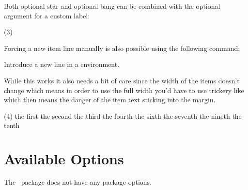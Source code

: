 \documentclass{tasks-manual}
\begin{document}
Both optional star and optional bang can be combined with the optional
argument for a custom label:
\begin{example}
  \begin{tasks}(3)
    \task \sample
    \task* \sample
    \task*[(x)] \sample
    \task \sample
    \task \sample
  \end{tasks}
\end{example}

Forcing a new item line manually is also possible using the
following command:
\begin{commands}
    Introduce a new line in a  environment.
\end{commands}
While this works it also needs a bit of care since the width of the items
doesn't change which means in order to use the full width you'd have to use
trickery like  which then means the danger of the item text sticking
into the margin.

\begin{example}
  \begin{tasks}(4)
    \task the first
    \task the second
    \task the third
    \task the fourth
    \task {}
      \startnewitemline 
    \task the sixth
    \task the seventh
    \task {} \startnewitemline
    \task the nineth
    \task the tenth
  \end{tasks}
\end{example}

\section{Available Options}\label{sec:tasks:options}

The \Tasks\ package does not have any package options.
\end{document}
